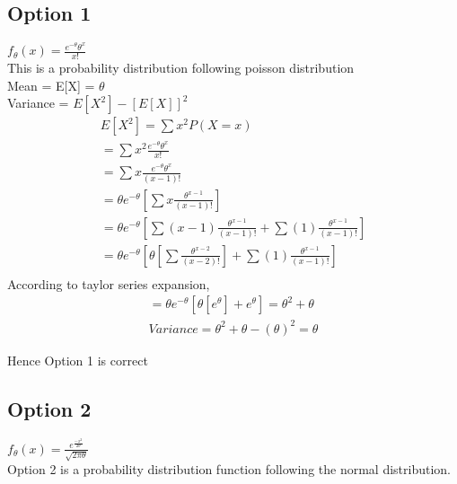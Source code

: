 \documentclass[12pt]{article}
\begin{document}
\subsection{Option 1}
$f_{\theta}(x) = \frac{e^{-\theta}{\theta}^{x}}{x!}$ \\
This is a probability distribution following poisson distribution \\ 
Mean = E[X] = $\theta$ \\
Variance = $E[X^{2}] - [E[X]]^{2} $\\

\begin{align*}
    E[X^{2}] = \sum{x^{2}P(X=x)}\\   
    = \sum{x^{2}\frac{e^{-\theta}{\theta}^{x}}{x!}} \\
    = \sum{x\frac{e^{-\theta}{\theta}^{x}}{(x-1)!}} \\
    = {\theta}e^{-\theta}[\sum{x\frac{\theta^{x-1}}{(x-1)!}}] \\ 
    = {\theta}e^{-\theta}[\sum{(x-1)\frac{\theta^{x-1}}{(x-1)!}} + \sum{(1)\frac{\theta^{x-1}}{(x-1)!}}] \\ 
    = {\theta}e^{-\theta}[{\theta}[\sum{\frac{\theta^{x-2}}{(x-2)!}}] + \sum{(1)\frac{\theta^{x-1}}{(x-1)!}}] \\
\end{align*}
According to taylor series expansion,
\begin{align*}
    = {\theta}e^{-\theta}[{\theta}[e^{\theta}] + e^{\theta}]
    = \theta^{2} + \theta \\
    Variance = \theta^{2} + \theta - (\theta)^{2} = \theta
\end{align*}

Hence Option 1 is correct

\subsection{Option 2}
$f_{\theta}(x) = \frac{e^{\frac{-x^{2}}{2{\theta}}}}{\sqrt{2\pi\theta}}$ \\
Option 2 is a probability distribution function following the normal distribution.\\
\end{document}
